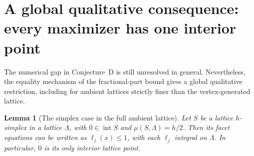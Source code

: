 \documentclass[11pt,a4paper]{article}
\newtheorem{lemma}[theorem]{Lemma}
\theoremstyle{remark}\newtheorem{remark}[theorem]{Remark}
\DeclareMathOperator{\inter}{int}
\begin{document}
\section{A global qualitative consequence: every maximizer has one interior point}
\label{d:unique-section}

The numerical gap in Conjecture~D is still unresolved in general.
Nevertheless, the equality mechanism of the fractional-part bound
gives a global qualitative restriction, including for ambient
lattices strictly finer than the vertex-generated lattice.

\begin{lemma}[The simplex case in the full ambient lattice]\label{d:simplex-unique}
Let $S$ be a lattice $h$-simplex in a lattice $\Lambda$, with
$0\in\inter S$ and $\mu(S,\Lambda)=h/2$. Then its facet equations
can be written as $\ell_j(x)\le1$, with each $\ell_j$ integral
on $\Lambda$. In particular, $0$ is its only interior lattice point.
\end{lemma}
\end{document}
